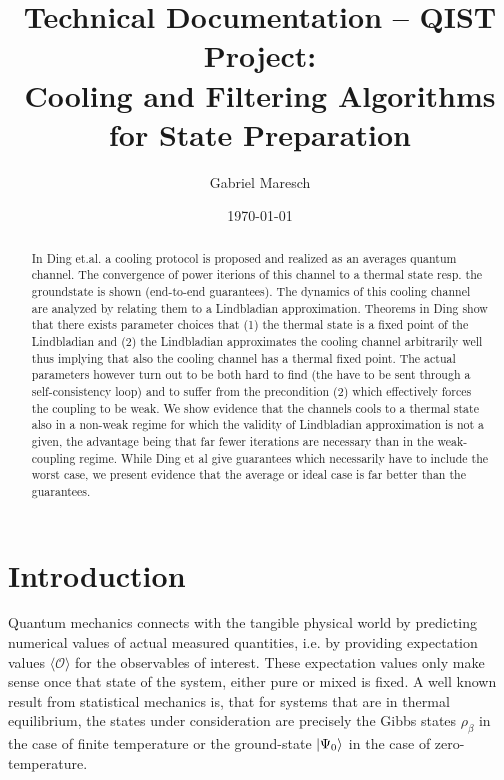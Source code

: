 \documentclass[11pt,a4paper]{article}
\title{Technical Documentation \--- QIST Project:\\ Cooling and Filtering 
Algorithms for State Preparation}
\author{Gabriel Maresch}
\date{\today}
\begin{document}
\maketitle
\begin{abstract}
In Ding et.al. a cooling protocol is proposed and realized as an averages quantum channel. The convergence of power iterions of this channel to a thermal state resp. the groundstate is shown (end-to-end guarantees). The dynamics of this cooling channel are analyzed by relating them to a Lindbladian approximation. Theorems in Ding show that there exists parameter choices that (1) the thermal state is a fixed point of the Lindbladian and (2) the Lindbladian approximates the cooling channel arbitrarily well thus implying that also the cooling channel has a thermal fixed point. The actual parameters however turn out to be both hard to find (the have to be sent through a self-consistency loop) and to suffer from the precondition (2) which effectively forces the coupling to be weak. We show evidence that the channels cools to a thermal state also in a non-weak regime for which the validity of Lindbladian approximation is not a given, the advantage being that far fewer iterations are necessary than in the weak-coupling regime. While Ding et al give guarantees which necessarily have to include the worst case, we present evidence that the average or ideal case is far better than the guarantees.
\end{abstract}

\section*{Introduction}

Quantum mechanics connects with the tangible physical world by predicting  numerical values of actual measured quantities, i.e. by providing expectation values $\langle \mathcal{O} \rangle$ for the observables of interest. These expectation values only make sense once that state of the system, either pure or mixed is fixed. A well known result from statistical mechanics is, that for systems that are in thermal equilibrium, the states under consideration are precisely the Gibbs states $\rho_{\beta}$ in the case of finite temperature or the ground-state $\ket{\Psi_0}$ in the case of zero-temperature. 
\end{document}
